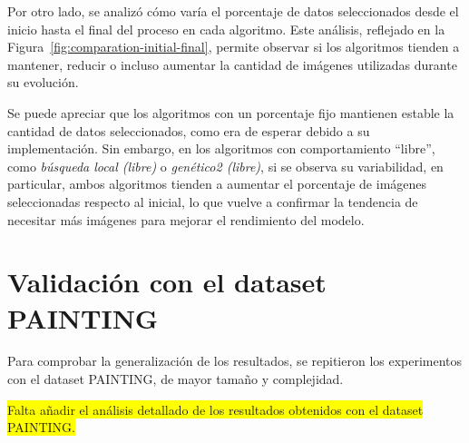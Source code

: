 Por otro lado, se analizó cómo varía el porcentaje de datos seleccionados desde el inicio hasta el final del proceso en cada algoritmo.
Este análisis, reflejado en la Figura~\ref{fig:comparation-initial-final}, permite observar si los algoritmos tienden a mantener,
reducir o incluso aumentar la cantidad de imágenes utilizadas durante su evolución.


Se puede apreciar que los algoritmos con un porcentaje fijo mantienen estable la cantidad de datos seleccionados, como era de esperar debido a su implementación.
Sin embargo, en los algoritmos con comportamiento “libre”, como \textit{búsqueda local (libre)} o \textit{genético2 (libre)}, si se observa su variabilidad,
en particular, ambos algoritmos tienden a aumentar el porcentaje de imágenes seleccionadas respecto al inicial,
lo que vuelve a confirmar la tendencia de necesitar más imágenes para mejorar el rendimiento del modelo.


\section{Validación con el dataset PAINTING}\label{sec:validacion-con-el-dataset-painting}
Para comprobar la generalización de los resultados, se repitieron los experimentos con el dataset PAINTING, de mayor tamaño y complejidad.

\colorbox{yellow}{Falta añadir el análisis detallado de los resultados obtenidos con el dataset PAINTING.}